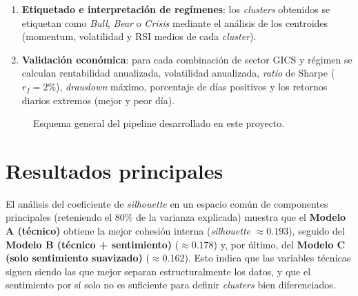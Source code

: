 \begin{enumerate}
  \textbf{Modelo C} (solo sentimiento sectorial suavizado) --- con
  $K=3$, seleccionado mediante el método del codo y el coeficiente de
  \textit{silhouette}. Adicionalmente se entrena un \textbf{modelo HMM}
  (\textit{Gaussian Hidden Markov Model}, covarianza completa, $K=3$
  estados) sobre los mismos conjuntos de variables como método de
  comparación.
  \item \textbf{Etiquetado e interpretación de regímenes}: los
  \textit{clusters} obtenidos se etiquetan como \emph{Bull},
  \emph{Bear} o \emph{Crisis} mediante el análisis de los centroides
  (momentum, volatilidad y RSI medios de cada \textit{cluster}).
  \item \textbf{Validación económica}: para cada combinación de
  sector GICS y régimen se calculan rentabilidad anualizada,
  volatilidad anualizada, \textit{ratio} de Sharpe ($r_f=2\%$),
  \textit{drawdown} máximo, porcentaje de días positivos y los
  retornos diarios extremos (mejor y peor día).
\end{enumerate}

\begin{figure}[H]
  \centering
  \caption{Esquema general del pipeline desarrollado en este proyecto.}
  \label{fig:resumen-pipeline}
\end{figure}

\section*{Resultados principales}

El análisis del coeficiente de \textit{silhouette} en un espacio común de
componentes principales (reteniendo el 80\% de la varianza explicada)
muestra que el \textbf{Modelo A (técnico)} obtiene la mejor cohesión
interna (\textit{silhouette} $\approx 0.193$), seguido del \textbf{Modelo
B (técnico + sentimiento)} ($\approx 0.178$) y, por último, del
\textbf{Modelo C (solo sentimiento suavizado)} ($\approx 0.162$). Esto
indica que las variables técnicas siguen siendo las que mejor separan
estructuralmente los datos, y que el sentimiento por sí solo no es
suficiente para definir \textit{clusters} bien diferenciados.

